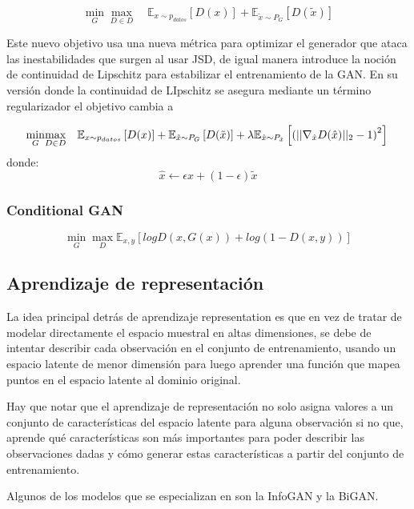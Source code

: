 \begin{equation}
	\underset{G}{\min}\underset{D \in D}{\max}\quad \mathbb{E}_{x \sim  p_{datos}}\left[ D (x) \right] + \mathbb{E}_{\tilde{x}\sim P_{G}}\left[ D(\tilde{x})\right]
\end{equation}

Este nuevo objetivo usa una nueva métrica para optimizar el generador que ataca las inestabilidades que surgen al usar JSD, de igual manera introduce la noción de continuidad de Lipschitz para estabilizar el entrenamiento de la GAN. En su versión donde la continuidad de LIpschitz se asegura mediante un término regularizador el objetivo cambia a

\begin{equation}
	\underset{G}{\min}\underset{D \in D}{\max}\quad \mathbb{E}_{x \sim  p_{datos}}\left[ D (x) \right] + \mathbb{E}_{\tilde{x}\sim P_{G}}\left[ D(\tilde{x})\right] + \lambda \mathbb{E}_{\hat{x}\sim P_{\hat{x}}}\left[ \left( || \nabla_{\hat{x}}D(\hat{x})||_{2} - 1\right) ^2 \right]\\
\end{equation}
\qquad\qquad donde:
\[
	\hat{x} \leftarrow \epsilon x + (1 - \epsilon) \tilde{x}
\]

\subsubsection{Conditional GAN}

\begin{equation}
	\underset{G}{\min}\underset{D}{\max} \mathbb{E}_{x,y}\left[ log D (x, G(x)) +  log (1 - D(x,y) ) \right]
\end{equation}

\subsection{Aprendizaje de representación}

La idea principal detrás de aprendizaje representation es que en vez de tratar de modelar directamente el espacio muestral en altas dimensiones, se debe de intentar describir cada observación en el conjunto de entrenamiento,  usando un espacio latente de menor dimensión para luego aprender una función que mapea puntos en el espacio latente al dominio original.

Hay que notar que el aprendizaje de representación no solo asigna valores a un conjunto de características del espacio latente para alguna observación si no que, aprende qué características son más importantes para poder describir las observaciones dadas y cómo generar estas características a partir del conjunto de entrenamiento.

Algunos de los modelos que se especializan en son la InfoGAN y la BiGAN.
